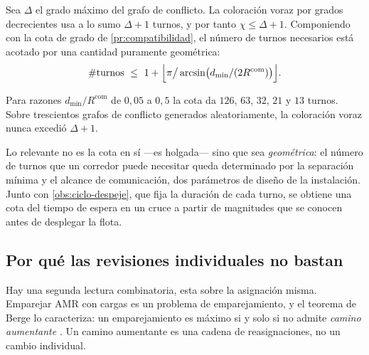 \begin{proposicion}
\label{pr:rondas-color}
Sea $\Delta$ el grado máximo del grafo de conflicto. La coloración voraz por
grados decrecientes usa a lo sumo $\Delta+1$ turnos, y por tanto
$\chi\le\Delta+1$. Componiendo con la cota de grado de
\cref{pr:compatibilidad}, el número de turnos necesarios está acotado por una
cantidad puramente geométrica:
\[
  \#\text{turnos}\ \le\ 1+\Bigl\lfloor \pi\big/\arcsin\bigl(d_{\min}/(2R^{\mathrm{com}})\bigr)\Bigr\rfloor .
\]
\end{proposicion}

\begin{observacion}
\label{obs:rondas-num}
Para razones $d_{\min}/R^{\mathrm{com}}$ de $0{,}05$ a $0{,}5$ la cota da $126$,
$63$, $32$, $21$ y $13$ turnos. Sobre trescientos grafos de conflicto generados
aleatoriamente, la coloración voraz nunca excedió $\Delta+1$.

Lo relevante no es la cota en sí —es holgada— sino que sea \emph{geométrica}: el
número de turnos que un corredor puede necesitar queda determinado por la
separación mínima y el alcance de comunicación, dos parámetros de diseño de la
instalación. Junto con \cref{obs:ciclo-despeje}, que fija la duración de cada
turno, se obtiene una cota del tiempo de espera en un cruce a partir de
magnitudes que se conocen antes de desplegar la flota.
\end{observacion}

\subsection{Por qué las revisiones individuales no bastan}

Hay una segunda lectura combinatoria, esta sobre la asignación misma. Emparejar
AMR con cargas es un problema de emparejamiento, y el teorema de Berge lo
caracteriza: un emparejamiento es máximo si y solo si no admite \emph{camino
aumentante} \cite{yadav2023advanced}. Un camino aumentante es una cadena de
reasignaciones, no un cambio individual.

